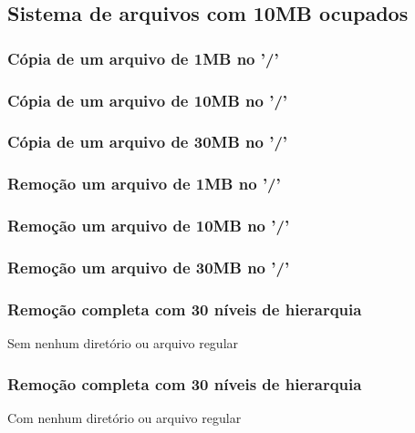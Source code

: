 \documentclass{beamer}
\begin{document}
\subsection{Sistema de arquivos com 10MB ocupados}
\begin{frame}
\frametitle{Cópia de um arquivo de 1MB no '/'} 

\justifying
\end{frame}


\begin{frame}
\frametitle{Cópia de um arquivo de 10MB no '/'} 

\justifying
\end{frame}


\begin{frame}
\frametitle{Cópia de um arquivo de 30MB no '/'} 

\justifying
\end{frame}


\begin{frame}
\frametitle{Remoção um arquivo de 1MB no '/'} 

\justifying
\end{frame}


\begin{frame}
\frametitle{Remoção um arquivo de 10MB no '/'} 

\justifying
\end{frame}


\begin{frame}
\frametitle{Remoção um arquivo de 30MB no '/'} 

\justifying
\end{frame}

\begin{frame}
\frametitle{Remoção completa com 30 níveis de hierarquia} 
Sem nenhum diretório ou arquivo regular
\justifying
\end{frame}


\begin{frame}
\frametitle{Remoção completa com 30 níveis de hierarquia} 
Com nenhum diretório ou arquivo regular
\justifying
\end{frame}
\end{document}
